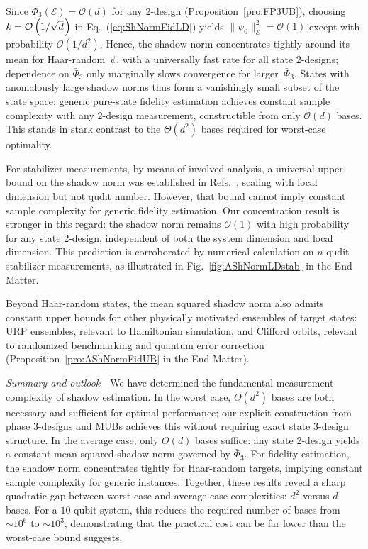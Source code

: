 \documentclass[aps,pra,twocolumn,nofootinbib,superscriptaddress,10pt]{revtex4-2}
\newcommand{\lsp}{\mkern 2mu}           %
\newcommand{\caE}{\mathcal{E}}
\newcommand{\caO}{\mathcal{O}}
\newcommand{\bPhi}{\bar{\Phi}}
\newcommand{\eref}[1]{Eq.~\textup{(\ref{#1})}}
\newcommand{\fref}[1]{Fig.~\ref{#1}}
\newcommand{\pref}[1]{Proposition~\ref{#1}}
\newcommand{\rscite}[1]{Refs.~\cite{#1}}
\begin{document}
Since $\bPhi_3(\caE)=\caO(d)$ for any 2-design (\pref{pro:FP3UB}), choosing $k=\caO\left(1/\sqrt{d}\lsp\right)$ in \eref{eq:ShNormFidLD} yields $\|\psi_0\|_\caE^2=\caO(1)$ except with probability $\caO(1/d^2)$. Hence, the shadow norm concentrates tightly around its mean for Haar-random~$\psi$, with a universally fast rate for all state 2-designs; dependence on $\bPhi_3$ only marginally slows convergence for larger~$\bPhi_3$. States with anomalously large shadow norms thus form a vanishingly small subset of the state space: generic pure-state fidelity estimation achieves constant sample complexity with any 2-design measurement, constructible from only $\caO(d)$ bases. This stands in stark contrast to the $\Theta(d^2)$ bases required for worst-case optimality.

For stabilizer measurements, by means of involved analysis, a universal upper bound on the shadow norm was established in \rscite{Mao25,ZhuMC24}, scaling with local dimension but not qudit number. However, that bound cannot imply constant sample complexity for generic fidelity estimation. Our concentration result is stronger in this regard: the shadow norm remains $\caO(1)$ with high probability for any state 2-design, independent of both the system dimension and local dimension. This prediction
is corroborated by numerical calculation on $n$-qudit stabilizer measurements, as illustrated 
in \fref{fig:AShNormLDstab} in the End Matter.


Beyond Haar-random states, the mean squared shadow norm also admits constant upper bounds for other physically motivated ensembles of target states: URP ensembles, relevant to Hamiltonian simulation, and Clifford orbits, relevant to randomized benchmarking and quantum error correction (\pref{pro:AShNormFidUB} in the End Matter).

\emph{Summary and outlook}---We have determined the fundamental measurement complexity of shadow estimation. In the worst case, $\Theta(d^2)$ bases are both necessary and sufficient for optimal performance; our explicit construction from phase 3-designs and MUBs achieves this without requiring exact state 3-design structure. In the average case, only $\Theta(d)$ bases suffice: any state 2-design yields a constant mean squared shadow norm governed by $\bPhi_3$. For fidelity estimation, the shadow norm concentrates tightly for Haar-random targets, implying constant sample complexity for generic instances. Together, these results reveal a sharp quadratic gap between worst-case and average-case complexities: $d^2$ versus $d$ bases. For a $10$-qubit system, this reduces the required number of bases from ${\sim}10^6$ to ${\sim}10^3$, demonstrating that the practical cost can be far lower than the worst-case bound suggests.
\end{document}
